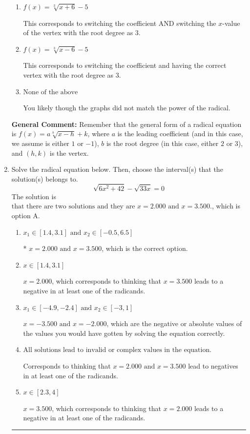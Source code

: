 \documentclass{extbook}[14pt]
\newcommand{\litem}[1]{\item #1

\rule{\textwidth}{0.4pt}}
\begin{document}
\begin{enumerate}
{\begin{enumerate}[label=\Alph*.]
* This is the correct option.
\item \( f(x) = \sqrt[3]{x + 6} - 5 \)

This corresponds to switching the coefficient AND switching the $x$-value of the vertex with the root degree as $3$.
\item \( f(x) = \sqrt[3]{x - 6} - 5 \)

This corresponds to switching the coefficient and having the correct vertex with the root degree as $3$.
\item \( \text{None of the above} \)

You likely though the graphs did not match the power of the radical.
\end{enumerate}

\textbf{General Comment:} Remember that the general form of a radical equation is $ f(x) = a \sqrt[b]{x - h} + k$, where $a$ is the leading coefficient (and in this case, we assume is either $1$ or $-1$), $b$ is the root degree (in this case, either $2$ or $3$), and $(h, k)$ is the vertex.
}
\litem{
Solve the radical equation below. Then, choose the interval(s) that the solution(s) belongs to.
\[ \sqrt{6 x^2 + 42} - \sqrt{33 x} = 0 \]The solution is \( \text{that there are two solutions and they are } x = 2.000 \text{ and } x = 3.500. \), which is option A.\begin{enumerate}[label=\Alph*.]
\item \( x_1 \in [1.4, 3.1] \text{ and } x_2 \in [-0.5,6.5] \)

* $x = 2.000 \text{ and } x = 3.500$, which is the correct option.
\item \( x \in [1.4,3.1] \)

$x = 2.000$, which corresponds to thinking that $x = 3.500$ leads to a negative in at least one of the radicands.
\item \( x_1 \in [-4.9, -2.4] \text{ and } x_2 \in [-3,1] \)

$x = -3.500 \text{ and } x = -2.000$, which are the negative or absolute values of the values you would have gotten by solving the equation correctly.
\item \( \text{All solutions lead to invalid or complex values in the equation.} \)

Corresponds to thinking that $x = 2.000 \text{ and } x = 3.500$ lead to negatives in at least one of the radicands.
\item \( x \in [2.3,4] \)

$x = 3.500$, which corresponds to thinking that $x = 2.000$ leads to a negative in at least one of the radicands.
\end{enumerate}

}
\end{enumerate}
\end{document}
